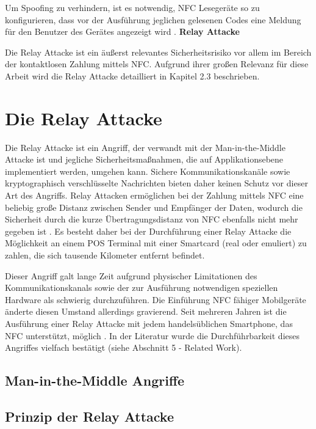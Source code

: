 Um Spoofing zu verhindern, ist es notwendig, NFC Lesegeräte so zu konfigurieren, dass vor der Ausführung jeglichen gelesenen Codes eine Meldung für den Benutzer des Gerätes angezeigt wird \cite{nfcTechVulnAttack}. 
\newline
\newline
\textbf{Relay Attacke}

Die Relay Attacke ist ein äußerst relevantes Sicherheitsrisiko vor allem im Bereich der kontaktlosen Zahlung mittels NFC. Aufgrund ihrer großen Relevanz für diese Arbeit wird die Relay Attacke detailliert in Kapitel 2.3 beschrieben.

\section{Die Relay Attacke}

Die Relay Attacke ist ein Angriff, der verwandt mit der Man-in-the-Middle Attacke ist und jegliche Sicherheitsmaßnahmen, die auf Applikationsebene implementiert werden, umgehen kann. Sichere Kommunikationskanäle sowie kryptographisch verschlüsselte Nachrichten bieten daher keinen Schutz vor dieser Art des Angriffs. 
Relay Attacken ermöglichen bei der Zahlung mittels NFC eine beliebig große Distanz zwischen Sender und Empfänger der Daten, wodurch die Sicherheit durch die kurze Übertragungsdistanz von NFC ebenfalls nicht mehr gegeben ist \cite{nfcRelayWithOffTheShelfHardAndSoftware}. Es besteht daher bei der Durchführung einer Relay Attacke die Möglichkeit an einem POS Terminal mit einer Smartcard (real oder emuliert) zu zahlen, die sich tausende Kilometer entfernt befindet. 

Dieser Angriff galt lange Zeit aufgrund physischer Limitationen des Kommunikationskanals sowie der zur Ausführung notwendigen speziellen Hardware als schwierig durchzuführen. Die Einführung NFC fähiger Mobilgeräte änderte diesen Umstand allerdings gravierend. Seit mehreren Jahren ist die Ausführung einer Relay Attacke mit jedem handelsüblichen Smartphone, das NFC unterstützt, möglich \cite{practicalExperiencesNfcRelayAndroid}.  In der Literatur wurde die Durchführbarkeit dieses Angriffes vielfach bestätigt (siehe Abschnitt 5 - Related Work). 

\subsection{Man-in-the-Middle Angriffe}

\subsection{Prinzip der Relay Attacke}


